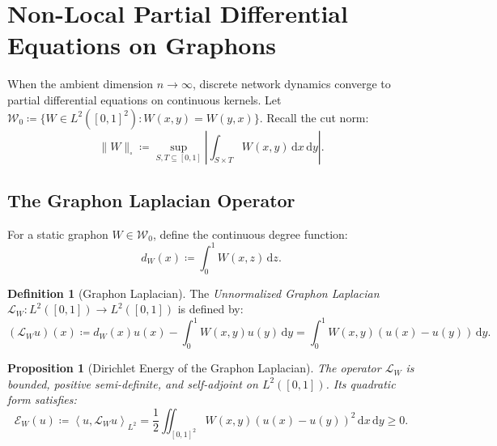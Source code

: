 \documentclass[11pt,a4paper,reqno]{amsart}
\newtheorem{proposition}[theorem]{Proposition}
\theoremstyle{definition}
\newtheorem{definition}[theorem]{Definition}
\numberwithin{equation}{section}
\newcommand{\cutnorm}[1]{\|#1\|_{\square}}
\newcommand{\inner}[2]{\left\langle #1, #2 \right\rangle}
\newcommand{\dif}{\,\mathrm{d}}
\begin{document}
\section{Non-Local Partial Differential Equations on Graphons}
\label{sec:graphon_pdes}

When the ambient dimension $n \to \infty$, discrete network dynamics converge to partial differential equations on continuous kernels. Let $\mathcal{W}_0 \coloneqq \{W \in L^2([0, 1]^2) \colon W(x, y) = W(y, x)\}$. Recall the cut norm:
\begin{equation}
    \label{eq:cut_norm_def_paper2}
    \cutnorm{W} \coloneqq \sup_{S, T \subseteq [0, 1]} \left| \int_{S \times T} W(x, y) \dif x \dif y \right|.
\end{equation}

\subsection{The Graphon Laplacian Operator}
For a static graphon $W \in \mathcal{W}_0$, define the continuous degree function:
\begin{equation}
    d_W(x) \coloneqq \int_0^1 W(x, z) \dif z.
\end{equation}

\begin{definition}[Graphon Laplacian]
The \emph{Unnormalized Graphon Laplacian} $\mathcal{L}_W \colon L^2([0, 1]) \to L^2([0, 1])$ is defined by:
\begin{equation}
    \label{eq:graphon_laplacian}
    (\mathcal{L}_W u)(x) \coloneqq d_W(x) u(x) - \int_0^1 W(x, y) u(y) \dif y = \int_0^1 W(x, y)(u(x) - u(y)) \dif y.
\end{equation}
\end{definition}

\begin{proposition}[Dirichlet Energy of the Graphon Laplacian]
The operator $\mathcal{L}_W$ is bounded, positive semi-definite, and self-adjoint on $L^2([0, 1])$. Its quadratic form satisfies:
\begin{equation}
    \label{eq:graphon_dirichlet}
    \mathcal{E}_W(u) \coloneqq \inner{u}{\mathcal{L}_W u}_{L^2} = \frac{1}{2} \iint_{[0,1]^2} W(x, y) (u(x) - u(y))^2 \dif x \dif y \ge 0.
\end{equation}
\end{proposition}
\end{document}
